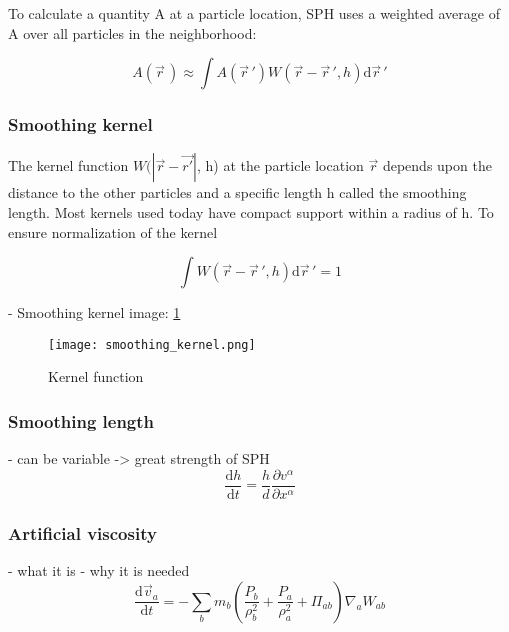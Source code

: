 To calculate a quantity A at a particle location, SPH uses a weighted average of A over all particles in the neighborhood:

\begin{equation}
    A(\vec{r}\,) \approx \int A(\vec{r}\,') W(\vec{r} - \vec{r}\,', h) \mathrm d\vec{r}\,'
\end{equation}

\subsubsection{Smoothing kernel}
The kernel function $W(|\vec{r} - \vec{r'}|$, h) at the particle location $\vec{r}$ depends upon the distance to the other particles and a specific length h called the smoothing length. Most kernels used today have compact support within a radius of h. To ensure normalization of the kernel

\begin{equation} \label{eq:kernel_normalization}
    \int W(\vec{r} - \vec{r}\,', h)\mathrm d\vec{r}\,' = 1
\end{equation}

- Smoothing kernel image: \ref{fig:smoothing_kernel}

\begin{figure}[H]
    \centering
    \texttt{[image: smoothing\_kernel.png]}
    \caption{Kernel function \cite{image:smoothing_kernel}}
    \label{fig:smoothing_kernel}
\end{figure}

\subsubsection{Smoothing length}
- can be variable -> great strength of SPH
\begin{equation}
    \frac{\mathrm{d}h}{\mathrm{d}t} = \frac{h}{d}\frac{\partial v^{\alpha}}{\partial x^{\alpha}}
\end{equation}

\subsubsection{Artificial viscosity}
- what it is
- why it is needed
\begin{equation}
    {\frac {\mathrm {d} {\vec {v}}_{a}}{\mathrm {d} t}}=-\sum \limits _{b}m_{b}\left({\frac {P_{b}}{\rho _{b}^{2}}}+{\frac {P_{a}}{\rho _{a}^{2}}}+\Pi _{ab}\right)\nabla _{a}W_{ab}
\end{equation}

